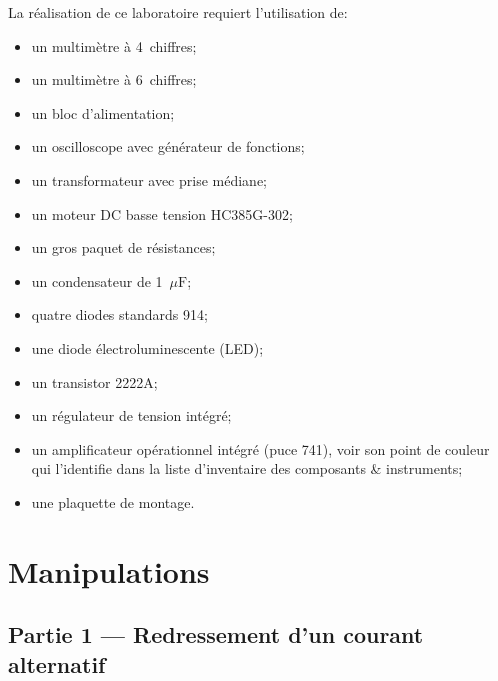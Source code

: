 \documentclass[canadien,12pt,oneside,letterpaper]{article}
\begin{document}
\noindent La réalisation de ce laboratoire requiert l'utilisation de:
\vspace{1ex}
\begin{itemize} \itemsep4pt
\item un multimètre à 4\textonehalf~chiffres;
\item un multimètre à 6\textonehalf~chiffres;
\item un bloc d'alimentation;
\item un oscilloscope avec générateur de fonctions;
\item un transformateur avec prise médiane;
\item un moteur DC basse tension HC385G-302;
\item un gros paquet de résistances; %
\item un condensateur de 1~$\mu\mathrm{F}$;%
\item quatre diodes standards 914;
\item une diode électroluminescente (LED);
\item un transistor 2222A;
\item un régulateur de tension intégré;
\item un amplificateur opérationnel intégré (puce 741), voir son point de couleur qui l'identifie dans la liste d'inventaire des composants \& instruments;
\item une plaquette de montage.
\end{itemize}


\section{Manipulations}

\setlength{\parskip}{1ex plus 0.5ex minus 0.2ex}

\subsection{Partie 1 --- Redressement d'un courant alternatif}
\end{document}
